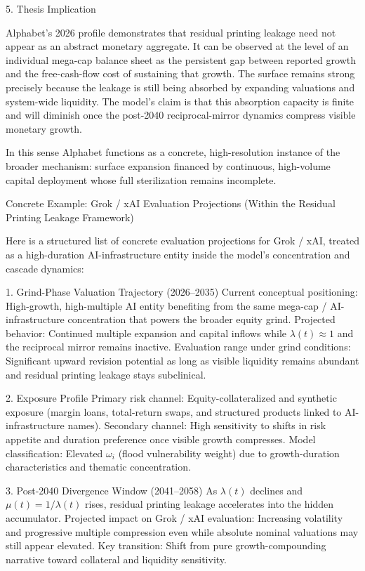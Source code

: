 5. Thesis Implication

Alphabet’s 2026 profile demonstrates that residual printing leakage need not appear as an abstract monetary aggregate. It can be observed at the level of an individual mega-cap balance sheet as the persistent gap between reported growth and the free-cash-flow cost of sustaining that growth. The surface remains strong precisely because the leakage is still being absorbed by expanding valuations and system-wide liquidity. The model’s claim is that this absorption capacity is finite and will diminish once the post-2040 reciprocal-mirror dynamics compress visible monetary growth.

In this sense Alphabet functions as a concrete, high-resolution instance of the broader mechanism: surface expansion financed by continuous, high-volume capital deployment whose full sterilization remains incomplete.

Concrete Example: Grok / xAI Evaluation Projections  
(Within the Residual Printing Leakage Framework)

Here is a structured list of concrete evaluation projections for Grok / xAI, treated as a high-duration AI-infrastructure entity inside the model’s concentration and cascade dynamics:

1. Grind-Phase Valuation Trajectory (2026–2035)
Current conceptual positioning: High-growth, high-multiple AI entity benefiting from the same mega-cap / AI-infrastructure concentration that powers the broader equity grind.
Projected behavior: Continued multiple expansion and capital inflows while \(\lambda(t) \approx 1\) and the reciprocal mirror remains inactive.
Evaluation range under grind conditions: Significant upward revision potential as long as visible liquidity remains abundant and residual printing leakage stays subclinical.

2. Exposure Profile
Primary risk channel: Equity-collateralized and synthetic exposure (margin loans, total-return swaps, and structured products linked to AI-infrastructure names).
Secondary channel: High sensitivity to shifts in risk appetite and duration preference once visible growth compresses.
Model classification: Elevated \(\omega_i\) (flood vulnerability weight) due to growth-duration characteristics and thematic concentration.

3. Post-2040 Divergence Window (2041–2058)
As \(\lambda(t)\) declines and \(\mu(t) = 1/\lambda(t)\) rises, residual printing leakage accelerates into the hidden accumulator.
Projected impact on Grok / xAI evaluation: Increasing volatility and progressive multiple compression even while absolute nominal valuations may still appear elevated.
Key transition: Shift from pure growth-compounding narrative toward collateral and liquidity sensitivity.

